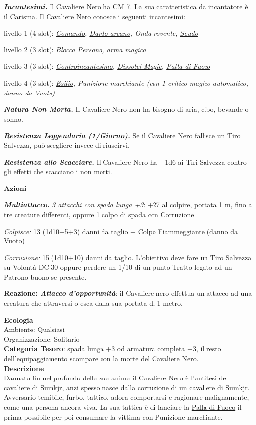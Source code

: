 \begin{multicols}{2}
{\emph{\textbf{Incantesimi.}} Il Cavaliere Nero ha CM 7. La sua caratteristica da incantatore è il Carisma. Il Cavaliere Nero conosce i seguenti incantesimi:

livello 1 (4 slot): \emph{\hyperlink{Comando}{Comando},  \hyperlink{Dardo arcano}{Dardo arcano}, Onda rovente, \hyperlink{Scudo}{Scudo}}

livello 2 (3 slot): \emph{\hyperlink{Blocca Persona}{Blocca Persona}, arma magica}

livello 3 (3 slot): \emph{\hyperlink{Controincantesimo}{Controincantesimo}, \hyperlink{Dissolvi Magie}{Dissolvi Magie}, \hyperlink{Palla di Fuoco}{Palla di Fuoco}}

livello 4 (3 slot): \emph{\hyperlink{Esilio}{Esilio}, Punizione marchiante (con 1 critico magico automatico, danno da Vuoto)}

\emph{\textbf{Natura Non Morta.}} Il Cavaliere Nero non ha bisogno di aria, cibo, bevande o sonno.

\emph{\textbf{Resistenza Leggendaria (1/Giorno).}} Se il Cavaliere Nero fallisce un Tiro Salvezza, può scegliere invece di riuscirvi.

\emph{\textbf{Resistenza allo Scacciare.}} Il Cavaliere Nero ha +1d6 ai Tiri Salvezza contro gli effetti che scacciano i non morti.

\textbf{Azioni}

\emph{\textbf{Multiattacco.} 3 attacchi con spada lunga +3}: +27 al colpire, portata 1 m, fino a tre creature differenti, oppure 1 colpo di spada con Corruzione

\emph{Colpisce:} 13 (1d10+5+3) danni da taglio + Colpo Fiammeggiante (danno da Vuoto)

\emph{Corruzione:} 15 (1d10+10) danni da taglio. L'obiettivo deve fare un Tiro Salvezza su Volontà DC 30 oppure perdere un 1/10 di un punto Tratto legato ad un Patrono buono se presente.

\textbf{Reazione: \emph{Attacco d'opportunità}}: il Cavaliere nero effettua un attacco ad una creatura che attraversi o esca dalla sua portata di 1 metro.

\textbf{Ecologia}\\
Ambiente: Qualsiasi\\
Organizzazione: Solitario\\
\textbf{Categoria Tesoro}: spada lunga +3 od armatura completa +3, il resto dell'equipaggiamento scompare con la morte del Cavaliere Nero.\\
\textbf{Descrizione}\\
Dannato fin nel profondo della sua anima il Cavaliere Nero è l'antitesi del cavaliere di Sumkjr, anzi spesso nasce dalla corruzione di un cavaliere di Sumkjr. Avversario temibile, furbo, tattico, adora comportarsi e ragionare malignamente, come una persona ancora viva. La sua tattica è di lanciare la \hyperlink{Palla di Fuoco}{Palla di Fuoco} il prima possibile per poi consumare la vittima con Punizione marchiante.

}
\end{multicols}
